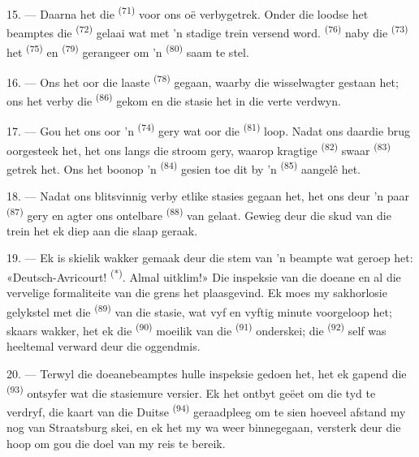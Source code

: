 
15. --- Daarna het die  \textsuperscript{(71)} voor ons oë
verbygetrek. Onder die loodse het beamptes die  \textsuperscript{(72)}
gelaai wat met 'n stadige trein versend word. 
\textsuperscript{(76)} naby die  \textsuperscript{(73)} het
 \textsuperscript{(75)} en  \textsuperscript{(79)}
gerangeer om 'n  \textsuperscript{(80)} saam te stel.

16. --- Ons het oor die laaste  \textsuperscript{(78)} gegaan, waarby die
wisselwagter gestaan het; ons het verby die  \textsuperscript{(86)}
gekom en die stasie het in die verte verdwyn.

17. --- Gou het ons oor 'n  \textsuperscript{(74)} gery wat oor die
 \textsuperscript{(81)} loop. Nadat ons daardie brug oorgesteek het, het
ons langs die stroom gery, waarop kragtige  \textsuperscript{(82)}
swaar  \textsuperscript{(83)} getrek het. Ons het boonop 'n
 \textsuperscript{(84)} gesien toe dit by 'n 
\textsuperscript{(85)} aangelê het.

18. --- Nadat ons blitsvinnig verby etlike stasies gegaan het, het ons deur 'n paar
 \textsuperscript{(87)} gery en agter ons ontelbare 
\textsuperscript{(88)} van  gelaat. Gewieg deur die skud van die
trein het ek diep aan die slaap geraak.

\VUsaut{3.0mm}
\VUsaut{3.0mm}

19. --- Ek is skielik wakker gemaak deur die stem van 'n beampte wat geroep het:
«Deutsch-Avricourt! \textsuperscript{(*)}. Almal uitklim!» Die inspeksie van die doeane
en al die vervelige formaliteite van die grens het plaasgevind. Ek moes my sakhorlosie
gelykstel met die  \textsuperscript{(89)} van die stasie, wat vyf en
vyftig minute voorgeloop het; skaars wakker, het ek die 
\textsuperscript{(90)} moeilik van die  \textsuperscript{(91)}
onderskei; die  \textsuperscript{(92)} self was heeltemal verward deur
die oggendmis.

20. --- Terwyl die doeanebeamptes hulle inspeksie gedoen het, het ek gapend die
 \textsuperscript{(93)} ontsyfer wat die stasiemure versier. Ek het
ontbyt geëet om die tyd te verdryf, die kaart van die Duitse 
\textsuperscript{(94)} geraadpleeg om te sien hoeveel afstand my nog van Straatsburg
skei, en ek het my wa weer binnegegaan, versterk deur die hoop om gou die doel van my
reis te bereik.
\VUsaut{6.0mm}
\VUfilet{22mm}
